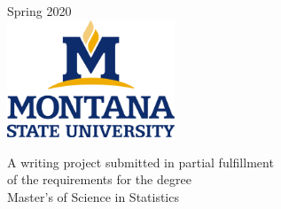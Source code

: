\documentclass[12pt]{article}\usepackage[]{graphicx}\usepackage[]{color}
\begin{document}
\begin{titlepage}
{\large Spring 2020}\\[1.5cm] %


\includegraphics[width=5cm]{msulogo} %
 

A writing project submitted in partial fulfillment\\
of the requirements for the degree\\[.25in]
Master's of Science in Statistics

\vfill %

\end{titlepage}
\end{document}
